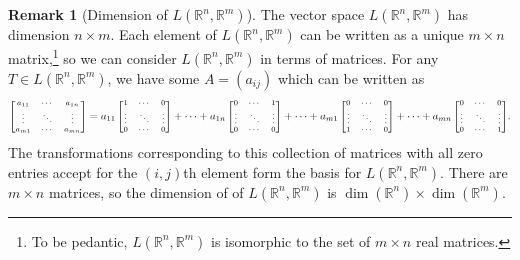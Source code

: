 \documentclass{article}
\newcommand{\R}{\mathbb{R}}
\renewcommand{\a}{\mathbf{a}}
\theoremstyle{definition}
\newtheorem{remark}{Remark}[section]
\begin{document}
	\begin{remark}[Dimension of $ L(\R^n,\R^m) $]
		The vector space $ L(\R^n,\R^m) $ has dimension $ n\times m $. Each element of $ L(\R^n,\R^m) $ can be written as a unique $ m\times n $ matrix,\footnote{To be pedantic, $ L(\R^n,\R^m) $ is isomorphic to the set of $ m\times n $ real matrices.} so we can consider $ L(\R^n,\R^m) $ in terms of matrices. For any $ T\in   L(\R^n,\R^m) $, we have some $ A=(a_{ij}) $ which can be written as 
		$$ {\scriptsize\begin{bmatrix}a_{11}&\cdots &a_{1n}\\ \vdots  &\ddots &\vdots \\a_{m1}&\cdots &a_{mn}\end{bmatrix} = a_{11} \begin{bmatrix}1&\cdots &0\\ \vdots  &\ddots &\vdots \\0&\cdots &0\end{bmatrix} + \cdots + a_{1n} \begin{bmatrix}0&\cdots &1\\ \vdots  &\ddots &\vdots \\0&\cdots &0\end{bmatrix} +\cdots +  a_{m1} \begin{bmatrix}0&\cdots &0\\ \vdots  &\ddots &\vdots \\1&\cdots &0\end{bmatrix} + \cdots + a_{mn} \begin{bmatrix}0&\cdots &0\\ \vdots  &\ddots &\vdots \\0&\cdots &1\end{bmatrix}}.$$
		The transformations corresponding to this collection of matrices with all zero entries accept for the $ (i,j) $th element form the basis for $ L(\R^n,\R^m) $. There are $ m\times n $ matrices, so the dimension of of $ L(\R^n,\R^m) $ is $ \dim(\R^n)\times \dim(\R^m) $. 
	\end{remark}
	
\end{document}
